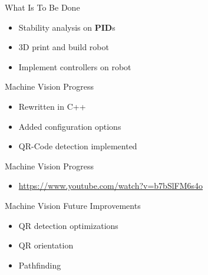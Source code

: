 \documentclass{beamer}
\begin{document}
\begin{frame}{What Is To Be Done}
    \begin{itemize}
        \item Stability analysis on \textbf{PID}s
        \item 3D print and build robot
        \item Implement controllers on robot
    \end{itemize}
\end{frame}





\begin{frame}{Machine Vision Progress}


    \begin{itemize}
        \item Rewritten in C++
        \item Added configuration options
        \item QR-Code detection implemented
    \end{itemize}


\end{frame}

\begin{frame}{Machine Vision Progress}


    \begin{itemize}
        \item \url{https://www.youtube.com/watch?v=b7bSlFM6s4o}
    \end{itemize}


\end{frame}

\begin{frame}{Machine Vision Future Improvements}


    \begin{itemize}
        \item QR detection optimizations
        \item QR orientation
        \item Pathfinding
    \end{itemize}


\end{frame}












\end{document}
